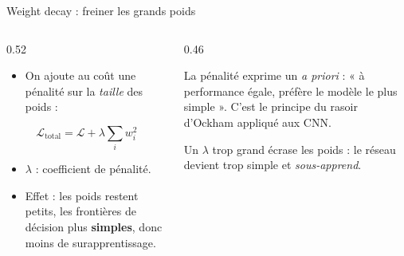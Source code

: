 \begin{frame}{Weight decay : freiner les grands poids}
\begin{columns}[t]
\begin{column}{0.52\textwidth}
\begin{itemize}
  \item On ajoute au coût une pénalité sur la \emph{taille} des poids :
\end{itemize}
\[
\mathcal{L}_{\text{total}} = \mathcal{L} + \lambda \sum_i w_i^2
\]
\begin{itemize}
  \item $\lambda$ : coefficient de pénalité.
  \item Effet : les poids restent petits, les frontières de décision plus
  \textbf{simples}, donc moins de surapprentissage.
\end{itemize}
\begin{kbox}
\end{kbox}
\end{column}
\begin{column}{0.46\textwidth}
\begin{ebox}[Interprétation]
La pénalité exprime un \emph{a priori} : « à performance égale, préfère le
modèle le plus simple ». C'est le principe du rasoir d'Ockham appliqué aux CNN.
\end{ebox}
\begin{wbox}
Un $\lambda$ trop grand écrase les poids : le réseau devient trop simple et
\emph{sous-apprend}.
\end{wbox}
\end{column}
\end{columns}
\end{frame}

